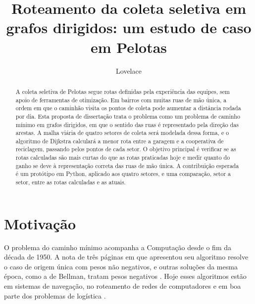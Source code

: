 \documentclass[diss-proposta]{texufpel}
\title{Roteamento da coleta seletiva em grafos dirigidos: um estudo de caso em Pelotas}
\author{Lovelace}{Ada}                          %
\begin{document}
\renewcommand{\advisorname}{Orientadora}

\maketitle   %
\sloppy      %

\begin{abstract}
A coleta seletiva de Pelotas segue rotas definidas pela experiência das
equipes, sem apoio de ferramentas de otimização. Em bairros com muitas ruas de
mão única, a ordem em que o caminhão visita os pontos de coleta pode aumentar
a distância rodada por dia. Esta proposta de dissertação trata o problema como
um problema de caminho mínimo em grafos dirigidos, em que o sentido das ruas é
representado pela direção das arestas. A malha viária de quatro setores de
coleta será modelada dessa forma, e o algoritmo de Dijkstra calculará a menor
rota entre a garagem e a cooperativa de reciclagem, passando pelos pontos de
cada setor. O objetivo principal é verificar se as rotas calculadas são mais
curtas do que as rotas praticadas hoje e medir quanto do ganho se deve à
representação correta das ruas de mão única. A contribuição esperada é um
protótipo em Python, aplicado aos quatro setores, e uma comparação, setor a
setor, entre as rotas calculadas e as atuais.
\end{abstract}

\chapter{Motivação}

O problema do caminho mínimo acompanha a Computação desde o fim da década de
1950. A nota de três páginas em que \citet{Dijkstra:1959:NTP} apresentou seu
algoritmo resolve o caso de origem única com pesos não negativos, e outras
soluções da mesma época, como a de Bellman, tratam pesos negativos
\citep{Cormen:2022:IA}. Hoje esses algoritmos estão em sistemas de navegação,
no roteamento de redes de computadores e em boa parte dos problemas de
logística \citep{Knuth:1997:ACP,Cormen:2022:IA}.
\end{document}
